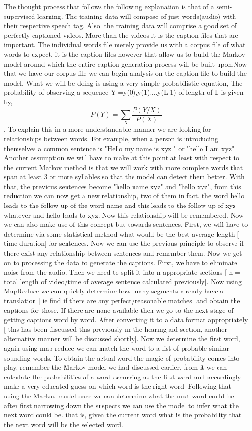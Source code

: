\documentclass[sigconf]{acmart}
\begin{document}
The thought process that follows the following explanation is that of a semi-supervised learning. The training data will compose of just words(audio) with their respective speech tag. Also, the training data will comprise a good set of perfectly captioned videos. More than the videos it is the caption files that are important. The individual words file merely provide us with a corpus file of what words to expect. it is the caption files however that allow us to build the Markov model around which the entire caption generation process will be built upon.Now that we have our corpus file we can begin analysis on the caption file to build the model. What we will be doing is using a very simple probabilistic equation\cite{Wikipedia2017a}, The probability of observing a sequence Y =y(0),y(1)....y(L-1) of length of L is given by, \[ P(Y) = \sum_{X}^{} \frac{P(Y/X)}{P(X)} \] . To explain this in a more understandable manner we are looking for relationships between words. For example, when a person is introducing themselves a common sentence is "Hello my name is xyz " or "hello I am xyz". Another assumption we will have to make at this point at least with respect to the current Markov method is that we will work with more complete words that span at least 3 or more syllables so that the model can detect them better. With that, the previous sentences become "hello name xyz" and "hello xyz", from this reduction we can now get a new relationship, two of them in fact. the word hello leads to the follow up of the word name and this leads to the follow up of xyz whatever and hello leads to xyz. Now this relationship will be remembered. Now we can also make use of this concept but towards sentences. First, we will have to determine via some statistical method what would be the best average length [ time duration] for sentences. Now we can use the previous principle to observe if there exist any relationship between sentences and remember them. Now we get on to processing the data to generate the captions. First, we have to eliminate noise from the audio. Then we need to split it into n appropriate sections [ n = total length of video/time of average sentence calculated previously].  Now using MapReduce we can quickly determine how many segments already have a translation [ ie find if there are any perfect/reasonable matches] and obtain the captions for those. If there are none available then we go to the next stage of getting captions word by word. After converting it to a data format appropriately [ this has been discussed this previously in the hearing aid section, another alternative manner will be discussed shortly]. Now we determine the first word, again using map reduce we can match the word to a list of probable similar sounding words. To obtain the actual word the magic of probability comes into play. remember the Markov model we had discussed earlier, from it we can calculate the probabilities of a word occurring as the first word and accordingly make a very educated guess on which word is the right word. Following that using the Markov model once we can determine what the next word could be after first narrowing down the suspects we can use the model to infer what the next word could be. that is, given the current word what is the probability that the next word will be the selected word. \newline
\end{document}
